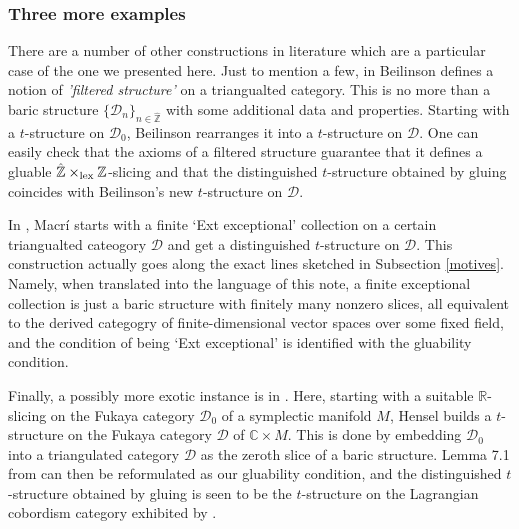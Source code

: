 \documentclass{article}
\newcommand\blankpage{
    \null
    \thispagestyle{empty}
    \addtocounter{page}{-1}
    \newpage}
\theoremstyle{definition}
\newcommand{\Z}{\mathbb{Z}}
\newcommand{\lex}{\times_{\textnormal{lex}}}
\begin{document}
\subsubsection{Three more examples}

There are a number of other constructions in literature which are a particular case of the one we presented here. Just to mention a few, in \cite{beil} Beilinson defines a notion of \textit{'filtered structure'} on a triangualted category. This is no more than a baric structure $\{ \mathscr{D}_{n} \}_{n \in \hat{\Z}}$ with some additional data and properties. Starting with a $t$-structure on $\mathscr{D}_0$, Beilinson rearranges it into a $t$-structure on $\mathscr{D}$. One can easily check that the axioms of a filtered structure guarantee that it defines a gluable $\hat{\Z} \lex \Z$-slicing and that the distinguished $t$-structure obtained by gluing coincides with Beilinson's new $t$-structure on $\mathscr{D}$. \\ 
\par

In \cite{macri}, Macr\'i starts with a finite `Ext exceptional' collection on a certain triangualted cateogory $\mathscr{D}$ and get a distinguished $t$-structure on $\mathscr{D}$. This construction actually goes along the exact lines sketched in Subsection \ref{motives}. Namely, when translated into the language of this note, a finite exceptional collection is just a baric structure with finitely many nonzero slices, all equivalent to the derived categogry of finite-dimensional vector spaces over some fixed field, and the condition of being `Ext exceptional' is identified with the gluability condition. \\
\par
Finally, a possibly more exotic instance is in \cite{lagra}. Here, starting with a suitable $\mathbb{R}$-slicing on the Fukaya category $\mathscr{D}_0$ of a symplectic manifold $M$, Hensel builds a $t$-structure on the Fukaya category $\mathscr{D}$ of $\mathbb{C} \times M$. This is done by embedding $\mathscr{D}_0$ into a triangulated category $\mathscr{D}$ as the zeroth slice of a baric structure. Lemma 7.1 from \cite{lagra} can then be reformulated as our gluability condition, and the distinguished $t$-structure obtained by gluing is seen to be the $t$-structure on the Lagrangian cobordism category exhibited by \cite{lagra}. \\



\newpage

\afterpage{\blankpage}
\clearpage 


\end{document}
